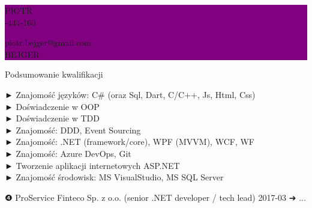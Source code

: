 \documentclass[a4paper,15pt]{letter}
\newcommand{\cvSectionHeader}[1]
{
\begin{flushright}
	\vspace{12pt}
	{\fontsize{19pt}{1em}\addfontfeature{LetterSpace=9.0}\selectfont #1 \hspace*{16pt}}
	\vspace{2pt}
\end{flushright}
}
\newcommand{\cvSectionEntryHeader}[4]
{
	\hspace{28pt}\parbox{.8\textwidth}
	{
		\fontsize{12pt}{1em}\selectfont
		#1 #2 #3 ➔ #4
	}
}
\begin{document}
\colorbox{purple}
{
	\color{white}
	\begin{minipage}[c]{\textwidth}
		\vspace{20pt}
			\begin{minipage}[c]{0.37\textwidth}
				\hfill\vfill
			\end{minipage} %
			\begin{minipage}[c]{0.27\textwidth}
				{\fontsize{50pt}{1em}\selectfont PIOTR} \vspace{11pt}\\
				{\fontsize{16pt}{1em}-444-160}\\
				\hfill\vfill
			\end{minipage} %
			\begin{minipage}[c]{0.01\textwidth}
				\hfill\vfill
			\end{minipage} %
			\begin{minipage}[c]{0.34\textwidth}
				{\fontsize{16pt}{1em}\selectfont piotr.bejger@gmail.com} \vspace{11pt}\\
				{\fontsize{50pt}{1em}\selectfont BEJGER}\\
				\hfill\vfill
			\end{minipage} %
			\begin{minipage}[c]{0.01\textwidth}
				\hfill\vfill
			\end{minipage} %
		\vspace{8pt}
	\end{minipage}
}

\cvSectionHeader{Podsumowanie kwalifikacji}

\hspace{32pt}\parbox{.5\textwidth}
{
► Znajomość języków: C\# (oraz Sql, Dart, C/C++, Js, Html, Css) \\
► Doświadczenie w OOP \\
► Doświadczenie w TDD \\
► Znajomość: DDD, Event Sourcing \\
► Znajomość: .NET (framework/core), WPF (MVVM), WCF, WF \\
► Znajomość: Azure DevOps, Git \\
► Tworzenie aplikacji internetowych ASP.NET \\
► Znajomość środowisk: MS VisualStudio, MS SQL Server
}

\cvSectionEntryHeader{❹}{ProService Finteco Sp. z o.o. (senior .NET developer / tech lead)}{2017-03}{...}
\end{document}
